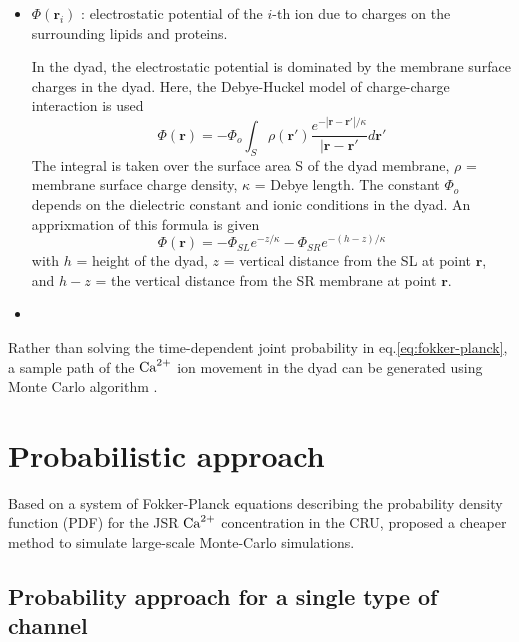 \begin{itemize}
  \item $\Phi(\mathbf{r}_i)$ : electrostatic potential of the $i$-th ion due to
  charges on the surrounding lipids and proteins.

In the dyad, the electrostatic potential is dominated by the membrane surface
charges in the dyad. Here, the Debye-Huckel model of charge-charge interaction 
is used
\begin{equation}
\Phi(\mathbf{r}) = -\Phi_o \int_S \rho(\mathbf{r}')
\frac{e^{-|\mathbf{r}-\mathbf{r'}|/\kappa}}{|\mathbf{r}-\mathbf{r'}}
d\mathbf{r'}
\end{equation}
The integral is taken over the surface area S of the dyad membrane, $\rho$ =
membrane surface charge density, $\kappa$ = Debye length. The constant $\Phi_o$
depends on the dielectric constant and ionic conditions in the dyad.
An apprixmation of this formula is given \citep{soeller1997}
\begin{equation}
\Phi(\mathbf{r}) = -\Phi_{SL} e^{-z/\kappa} - \Phi_{SR} e^{-(h-z)/\kappa}
\end{equation}
with $h$ = height of the dyad, $z$ = vertical distance from the SL at point
$\mathbf{r}$, and $h-z$ = the vertical distance from the SR membrane at point
$\mathbf{r}$.


  \item 
\end{itemize}

Rather than solving the time-dependent joint probability in
eq.\ref{eq:fokker-planck}, a sample path of the ${\text{Ca}^{2+}}$ ion movement in the dyad
can be generated using Monte Carlo algorithm \citep{wang2003robust}.

\section{Probabilistic approach}
\label{sec:prob-appr}

Based on a system of Fokker-Planck equations describing the probability density
function (PDF) for the JSR ${\text{Ca}^{2+}}$ concentration in the CRU, 
\citep{williams2007pda} proposed a cheaper method to simulate large-scale
Monte-Carlo simulations.

\subsection{Probability approach for a single type of channel}
\label{sec:prob-appr-single}

